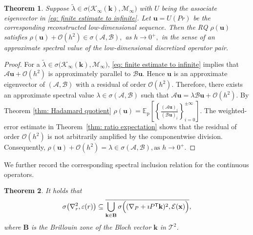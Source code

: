 \documentclass[11pt]{article}
\def\k{\mathbf{k}}
\def\x{\mathbf{x}}
\newtheorem{thm}{Theorem}[section]
\numberwithin{equation}{section}
\begin{document}
\begin{thm}
Suppose $ \widetilde{\lambda} \in  \sigma\bigl(\mathcal{K}_\infty(\k), \mathcal{M}_\infty\bigr)$ with $U$ being the associate eigenvector in \eqref{eq: finite estimate to infinite}.  Let $\boldsymbol{u}=U(Pr)$ be the corresponding reconstructed low-dimensional sequence. Then the RQ
$\rho(\boldsymbol{u})$ satisfies $
\rho(\boldsymbol{u})+\mathcal{O}(h^2) \in
\sigma(\mathcal{A},\mathcal{B}), $ as $ h\to0^+, $
in the sense of an approximate spectral value of the low-dimensional
discretized operator pair.
\end{thm}

\begin{proof}
 For a $ \widetilde{\lambda} \in  \sigma\bigl(\mathcal{K}_\infty(\k), \mathcal{M}_\infty\bigr)$, \eqref{eq: finite estimate to infinite} implies that $\mathcal{A}\boldsymbol{u} + \mathcal{O}(h^2)$ is approximately parallel to $\mathcal{B} \boldsymbol{u}$.
Hence $\boldsymbol{u}$ is an approximate eigenvector of $(\mathcal{A},\mathcal{B})$ with a residual of order \(\mathcal{O}(h^2)\). Therefore, there exists an approximate spectral value $\lambda \in \sigma(\mathcal{A}, \mathcal{B})$ such that $\mathcal{A}\boldsymbol{u} = \lambda \mathcal{B} \boldsymbol{u} + \mathcal{O}(h^2).$ By Theorem \ref{thm: Hadamard quotient} $\rho(\boldsymbol{u}) = \mathbb{E}_{\mathrm{p}} \left[
\left\{
\frac{(\mathcal{A}\boldsymbol{u})_i}{(\mathcal{B}\boldsymbol{u})_i}
\right\}_{i=0}^{\pm \infty}
\right]$. The weighted-error estimate in Theorem~\ref{thm: ratio expectation} shows that
the residual of order $\mathcal{O}(h^2)$ is not arbitrarily amplified by the
componentwise division. Consequently, $\rho(\boldsymbol{u}) + \mathcal{O}(h^2) = \lambda \in \sigma(\mathcal{A}, \mathcal{B}), \text{as}  \,\, h \to 0^+. $
\end{proof}

We further record the corresponding spectral inclusion relation for the
continuous operators.

\begin{thm} \label{thm: inclusion relation}
It holds that
\begin{equation}\label{set: spectrum including}
\sigma\bigl(\nabla_r^2,\varepsilon(r)\bigr)
\subseteq
\overline{
\bigcup_{\k \in \mathbf{B}}
\sigma\Bigl( (\nabla_P + \imath P^\mathsf{T} \k)^2, \mathcal{E}(\x) \Bigr)
},
\end{equation}
where \(\mathbf{B}\) is the Brillouin zone of the Bloch vector $\k$ in \(\mathcal{T}^2\).
\end{thm}
\end{document}
